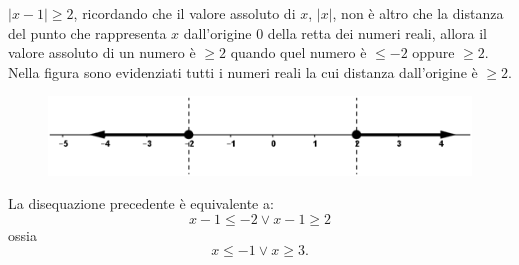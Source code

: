 \begin{esempio} $|x-1|\geq 2$, ricordando che il valore 
assoluto di $x$, $|x|$, non è altro che la distanza del punto che rappresenta 
$x$ dall'origine 0 della retta dei numeri reali, allora il valore assoluto di 
un numero è $\geq 2$ quando quel numero è $\leq -2$ oppure $\geq 2$.\\
        Nella figura sono evidenziati tutti i numeri reali la cui distanza 
dall'origine è $\geq 2$.

\begin{figure}[h]
\begin{inaccessibleblock}[TODO]
\centering
\includegraphics[width=0.9\linewidth]{img/imm5} %
\end{inaccessibleblock}
\label{fig:abs_imm5}
\end{figure}

        La disequazione precedente è equivalente a:
        $$x-1\leq -2 \vee x-1 \geq 2$$
        ossia
        $$x\leq -1 \vee x\geq 3.$$
\end{esempio}













